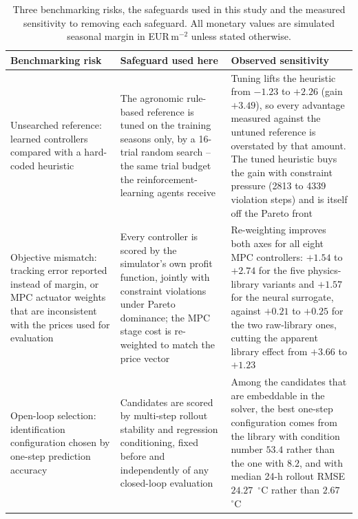 \begin{table}[htbp]
\centering
\caption{Three benchmarking risks, the safeguards used in this study and the measured
sensitivity to removing each safeguard. All monetary values are simulated seasonal margin
in EUR\,m$^{-2}$ unless stated otherwise.}
\label{tab:defects}
\begin{tabular}{p{}p{}p{}}
\toprule
\textbf{Benchmarking risk} & \textbf{Safeguard used here} & \textbf{Observed sensitivity} \\
\midrule
Unsearched reference: learned controllers compared with a hard-coded heuristic &
The agronomic rule-based reference is tuned on the training seasons only, by a 16-trial
random search -- the same trial budget the reinforcement-learning agents receive &
Tuning lifts the heuristic from $-1.23$ to $+2.26$ (gain $+3.49$), so every advantage
measured against the untuned reference is overstated by that amount. The tuned heuristic
buys the gain with constraint pressure (2813 to 4339 violation steps) and is itself off
the Pareto front \\
\addlinespace
Objective mismatch: tracking error reported instead of margin, or MPC actuator weights
that are inconsistent with the prices used for evaluation &
Every controller is scored by the simulator's own profit function, jointly with
constraint violations under Pareto dominance; the MPC stage cost is re-weighted to match
the price vector &
Re-weighting improves both axes for all eight MPC controllers: $+1.54$ to $+2.74$ for the
five physics-library variants and $+1.57$ for the neural surrogate, against $+0.21$ to
$+0.25$ for the two raw-library ones, cutting the apparent library effect from $+3.66$ to
$+1.23$ \\
\addlinespace
Open-loop selection: identification configuration chosen by one-step prediction accuracy &
Candidates are scored by multi-step rollout stability and regression conditioning, fixed
before and independently of any closed-loop evaluation &
Among the candidates that are embeddable in the solver, the best one-step configuration
comes from the library with condition number $53.4$ rather than the one with $8.2$, and
with median 24-h rollout RMSE $24.27$~$^\circ$C rather than $2.67$~$^\circ$C \\
\bottomrule
\end{tabular}
\end{table}

